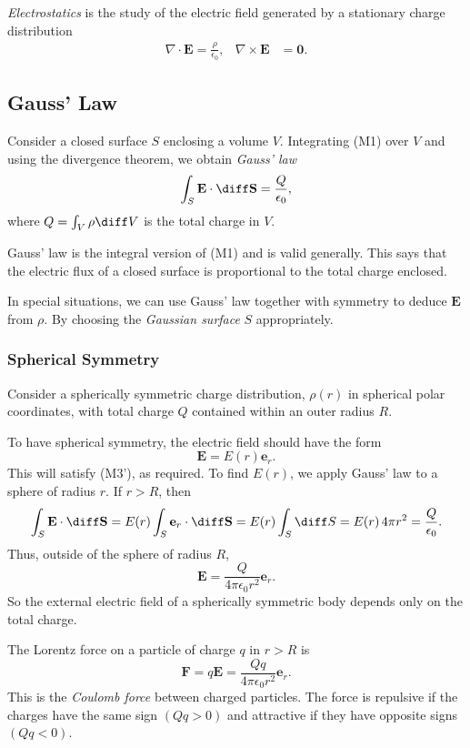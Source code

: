 \documentclass[12pt]{article}
\begin{document}
\emph{Electrostatics} is the study of the electric field generated by a stationary charge distribution
\begin{align*}
	\nabla \cdot \mathbf{E} = \frac{\rho}{\epsilon_0}, & \nabla \times \mathbf{E} &= \mathbf{0}.
\end{align*}

\subsection{Gauss' Law}
\label{sub:gauss_law}

Consider a closed surface $S$ enclosing a volume $V$. Integrating (M1) over $V$ and using the divergence theorem, we obtain \emph{Gauss' law}
\[
\int_{S} \mathbf{E} \cdot \diff \mathbf{S} = \frac{Q}{\epsilon_0}
,\]
where $Q = \int_{V} \rho \diff V$ is the total charge in $V$.

Gauss' law is the integral version of (M1) and is valid generally. This says that the electric flux of a closed surface is proportional to the total charge enclosed.

In special situations, we can use Gauss' law together with symmetry to deduce $\mathbf{E}$ from $\rho$. By choosing the \emph{Gaussian surface} $S$ appropriately.

\subsubsection{Spherical Symmetry}
\label{subsub:spherical_symmetry}

Consider a spherically symmetric charge distribution, $\rho(r)$ in spherical polar coordinates, with total charge $Q$ contained within an outer radius $R$.

To have spherical symmetry, the electric field should have the form
\[
	\mathbf{E} = E(r) \mathbf{e}_r
.\]
This will satisfy (M3'), as required. To find $E(r)$, we apply Gauss' law to a sphere of radius $r$. If $r > R$, then
\[
\int_{S}\mathbf{E}\cdot \diff \mathbf{S} = E(r) \int_{S} \mathbf{e}_r \cdot \diff \mathbf{S} = E(r) \int_{S} \diff S = E(r) \, 4 \pi r^2 = \frac{Q}{\epsilon_0}
.\]
Thus, outside of the sphere of radius $R$,
\[
\mathbf{E} = \frac{Q}{4 \pi \epsilon_0 r^2}\mathbf{e}_r
.\]
So the external electric field of a spherically symmetric body depends only on the total charge.

The Lorentz force on a particle of charge $q$ in $r > R$ is
\[
\mathbf{F} = q \mathbf{E} = \frac{Qq}{4 \pi \epsilon_0 r^2} \mathbf{e}_r
.\]
This is the \emph{Coulomb force} between charged particles. The force is repulsive if the charges have the same sign $(Qq > 0)$ and attractive if they have opposite signs $(Qq < 0)$.
\end{document}
